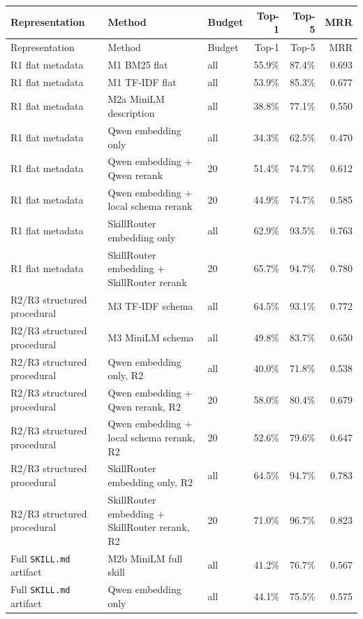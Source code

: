 {\tiny
\setlength{\tabcolsep}{2pt}
\begin{longtable}{@{}p{}p{}p{}rrr@{}}
\toprule
Representation & Method & Budget & Top-1 & Top-5 & MRR \\
\midrule
\endfirsthead
\toprule
Representation & Method & Budget & Top-1 & Top-5 & MRR \\
\midrule
\endhead
\bottomrule
\endfoot
R1 flat metadata & M1 BM25 flat & all & 55.9\% & 87.4\% & 0.693 \\
R1 flat metadata & M1 TF-IDF flat & all & 53.9\% & 85.3\% & 0.677 \\
R1 flat metadata & M2a MiniLM description & all & 38.8\% & 77.1\% & 0.550 \\
R1 flat metadata & Qwen embedding only & all & 34.3\% & 62.5\% & 0.470 \\
R1 flat metadata & Qwen embedding + Qwen rerank & 20 & 51.4\% & 74.7\% & 0.612 \\
R1 flat metadata & Qwen embedding + local schema rerank & 20 & 44.9\% & 74.7\% & 0.585 \\
R1 flat metadata & SkillRouter embedding only & all & 62.9\% & 93.5\% & 0.763 \\
R1 flat metadata & SkillRouter embedding + SkillRouter rerank & 20 & 65.7\% & 94.7\% & 0.780 \\
\midrule
R2/R3 structured procedural & M3 TF-IDF schema & all & 64.5\% & 93.1\% & 0.772 \\
R2/R3 structured procedural & M3 MiniLM schema & all & 49.8\% & 83.7\% & 0.650 \\
R2/R3 structured procedural & Qwen embedding only, R2 & all & 40.0\% & 71.8\% & 0.538 \\
R2/R3 structured procedural & Qwen embedding + Qwen rerank, R2 & 20 & 58.0\% & 80.4\% & 0.679 \\
R2/R3 structured procedural & Qwen embedding + local schema rerank, R2 & 20 & 52.6\% & 79.6\% & 0.647 \\
R2/R3 structured procedural & SkillRouter embedding only, R2 & all & 64.5\% & 94.7\% & 0.783 \\
R2/R3 structured procedural & SkillRouter embedding + SkillRouter rerank, R2 & 20 & 71.0\% & 96.7\% & 0.823 \\
\midrule
Full \texttt{SKILL.md} artifact & M2b MiniLM full skill & all & 41.2\% & 76.7\% & 0.567 \\
Full \texttt{SKILL.md} artifact & Qwen embedding only & all & 44.1\% & 75.5\% & 0.575 \\

\end{longtable}}
